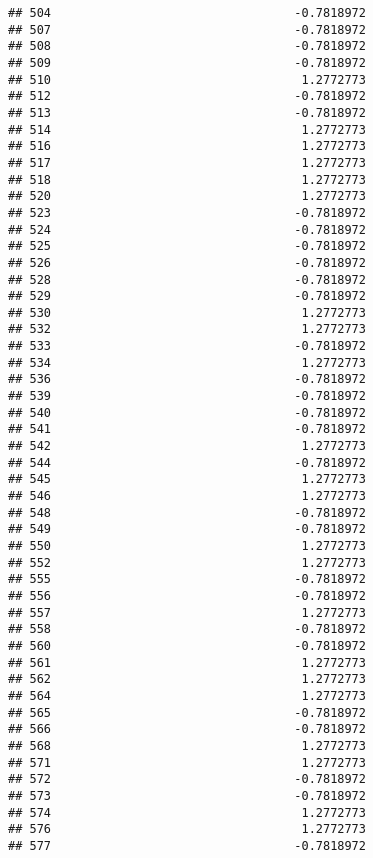 \documentclass[
]{article}
\begin{document}
\begin{verbatim}
## 504                                  -0.7818972
## 507                                  -0.7818972
## 508                                  -0.7818972
## 509                                  -0.7818972
## 510                                   1.2772773
## 512                                  -0.7818972
## 513                                  -0.7818972
## 514                                   1.2772773
## 516                                   1.2772773
## 517                                   1.2772773
## 518                                   1.2772773
## 520                                   1.2772773
## 523                                  -0.7818972
## 524                                  -0.7818972
## 525                                  -0.7818972
## 526                                  -0.7818972
## 528                                  -0.7818972
## 529                                  -0.7818972
## 530                                   1.2772773
## 532                                   1.2772773
## 533                                  -0.7818972
## 534                                   1.2772773
## 536                                  -0.7818972
## 539                                  -0.7818972
## 540                                  -0.7818972
## 541                                  -0.7818972
## 542                                   1.2772773
## 544                                  -0.7818972
## 545                                   1.2772773
## 546                                   1.2772773
## 548                                  -0.7818972
## 549                                  -0.7818972
## 550                                   1.2772773
## 552                                   1.2772773
## 555                                  -0.7818972
## 556                                  -0.7818972
## 557                                   1.2772773
## 558                                  -0.7818972
## 560                                  -0.7818972
## 561                                   1.2772773
## 562                                   1.2772773
## 564                                   1.2772773
## 565                                  -0.7818972
## 566                                  -0.7818972
## 568                                   1.2772773
## 571                                   1.2772773
## 572                                  -0.7818972
## 573                                  -0.7818972
## 574                                   1.2772773
## 576                                   1.2772773
## 577                                  -0.7818972

\end{verbatim}
\end{document}
